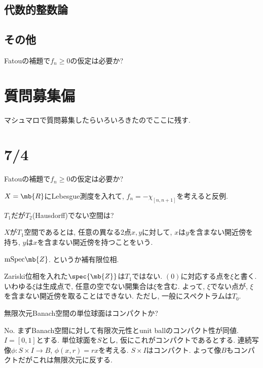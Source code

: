 \subsection{代数的整数論}




\subsection{その他}

\begin{prob}
Fatouの補題で$f_n\geq 0$の仮定は必要か?
\end{prob}



\clearpage 
\section{質問募集偏}
マシュマロで質問募集したらいろいろきたのでここに残す. 

\section{7/4}



\begin{prob}
Fatouの補題で$f_n\geq 0$の仮定は必要か?
\end{prob}
\begin{ans}
$X=\mb{R}$にLebesgue測度を入れて, $f_n = -\chi_{[n,n+1]}$を考えると反例. 
\end{ans}


\begin{prob}
$T_1$だが$T_2$(Hausdorff)でない空間は? 
\end{prob}
\begin{recall}
$X$が$T_1$空間であるとは, 任意の異なる2点$x,y$に対して, $x$は$y$を含まない開近傍を持ち, $y$は$x$を含まない開近傍を持つことをいう. 
\end{recall}
\begin{ans}
$\mathrm{mSpec}\mb{Z}$. というか補有限位相. 
\end{ans}
\begin{miss}
Zariski位相を入れた$\spec{\mb{Z}}$は$T_1$ではない. $(0)$に対応する点を$\xi$と書く. いわゆる$\xi$は生成点で, 任意の空でない開集合は$\xi$を含む. よって, $\xi$でない点が, $\xi$を含まない開近傍を取ることはできない. ただし, 一般にスペクトラムは$T_0$. 
\end{miss}

\begin{prob}
無限次元Banach空間の単位球面はコンパクトか? 
\end{prob}
\begin{ans}
No. まずBanach空間に対して有限次元性とunit ballのコンパクト性が同値. $I=[0,1]$とする. 単位球面を$S$とし, 仮にこれがコンパクトであるとする. 連続写像$\phi:S\times I\to B$, $\phi(x,r) = rx$を考える. $S\times I$はコンパクト. よって像$B$もコンパクトだがこれは無限次元に反する.
\end{ans}


